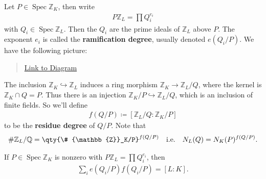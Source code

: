 \begin{definition}

Let \(P\in \operatorname{Spec}{\mathbb{Z}}_K\), then write
\begin{align*}
P{\mathbb{Z}}_L = \prod Q_i^{e_i}
\end{align*}
with \(Q_i \in \operatorname{Spec}{\mathbb{Z}}_L\). Then the \(Q_i\) are
the prime ideals of \({\mathbb{Z}}_L\) above \(P\). The exponent \(e_i\)
is called the \textbf{ramification degree}, usually denoted
\(e(Q_i/P)\). We have the following picture:

\begin{center}
\end{center}

\begin{quote}
\href{https://q.uiver.app/?q=WzAsNixbMCwwLCJMIl0sWzAsMiwiSyJdLFsyLDAsIlxcWlpfTCJdLFsyLDIsIlxcWlpfSyJdLFs0LDIsIlAiXSxbNCwwLCJRIl0sWzAsMSwiIiwwLHsic3R5bGUiOnsiaGVhZCI6eyJuYW1lIjoibm9uZSJ9fX1dLFsyLDMsIiIsMCx7InN0eWxlIjp7ImhlYWQiOnsibmFtZSI6Im5vbmUifX19XSxbNSw0LCIiLDAseyJzdHlsZSI6eyJoZWFkIjp7Im5hbWUiOiJub25lIn19fV1d}{Link
to Diagram}
\end{quote}

The inclusion \({\mathbb{Z}}_K \hookrightarrow{\mathbb{Z}}_L\) induces a
ring morphism \({\mathbb{Z}}_K \to {\mathbb{Z}}_L/Q\), where the kernel
is \({\mathbb{Z}}_K \cap Q = P\). Thus there is an injection
\({\mathbb{Z}}_K/P \hookrightarrow{\mathbb{Z}}_L/Q\), which is an
inclusion of finite fields. So we'll define
\begin{align*}
f(Q/P) \coloneqq[{\mathbb{Z}}_L/Q : {\mathbb{Z}}_K/P]
\end{align*}
to be the \textbf{residue degree} of \(Q/P\). Note that
\begin{align*}
\# {\mathbb{Z}}_L/{\mathbb{Q}}= \qty{\# {\mathbb{Z}}_K/P}^{f(Q/P)}
\quad\text{i.e.}\quad 
N_L(Q) = N_K(P)^{f(Q/P)}
.\end{align*}

\end{definition}

\begin{theorem}

If \(P \in \operatorname{Spec}{\mathbb{Z}}_K\) is nonzero with
\(P{\mathbb{Z}}_L = \prod Q_i^{e_i}\), then
\begin{align*}
\sum_i e(Q_i/P) f(Q_i/P) = [L: K]
.\end{align*}

\end{theorem}


